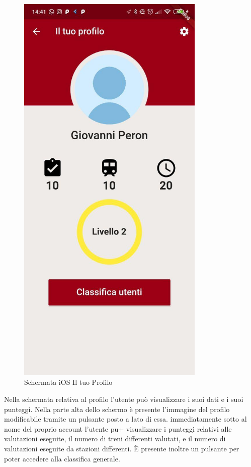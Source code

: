 \begin{minipage}{0.45\textwidth}
	\begin{figure}[H]
		\centering
		\includegraphics[width=0.8\textwidth]{immagini/profile.jpg}
		\caption{Schermata iOS Il tuo Profilo}
	\end{figure}
\end{minipage}

Nella schermata relativa al profilo l'utente può visualizzare i suoi dati e i suoi punteggi. Nella parte alta dello schermo è presente l'immagine del profilo modificabile tramite un pulsante posto a lato di essa. immediatamente sotto al nome del proprio account l'utente pu+ visualizzare i punteggi relativi alle valutazioni eseguite, il numero di treni differenti valutati, e il numero di valutazioni eseguite da stazioni differenti. È presente inoltre un pulsante per poter accedere alla classifica generale.

